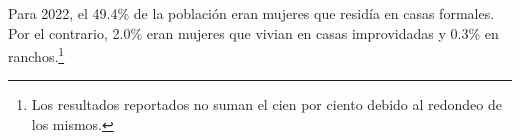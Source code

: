 Para 2022, el 49.4\% de la población eran mujeres que residía en casas formales. Por el contrario, 2.0\% eran mujeres que vivian en casas improvidadas y 0.3\% en ranchos.\footnote{Los resultados reportados no suman el cien por ciento debido al redondeo de los mismos.}